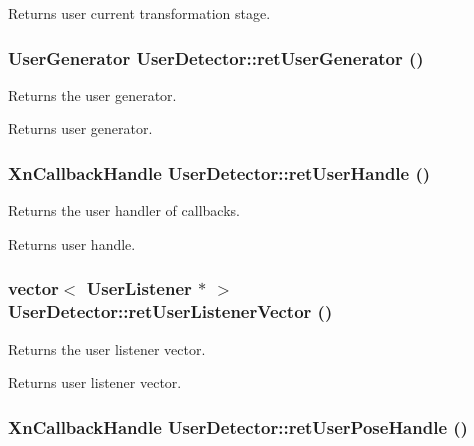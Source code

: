 \begin{DoxyReturn}{Returns}
user current transformation stage. 
\end{DoxyReturn}
\hypertarget{classUserDetector_a48f939c3a179902b64a7cd3306ce1945}{
\subsubsection[{retUserGenerator}]{\setlength{\rightskip}{0pt plus 5cm}UserGenerator UserDetector::retUserGenerator ()}}
\label{classUserDetector_a48f939c3a179902b64a7cd3306ce1945}
Returns the user generator. \begin{DoxyReturn}{Returns}
user generator. 
\end{DoxyReturn}
\hypertarget{classUserDetector_aa031f0e31c840bb0cc0926dc57c9e634}{
\subsubsection[{retUserHandle}]{\setlength{\rightskip}{0pt plus 5cm}XnCallbackHandle UserDetector::retUserHandle ()}}
\label{classUserDetector_aa031f0e31c840bb0cc0926dc57c9e634}
Returns the user handler of callbacks. \begin{DoxyReturn}{Returns}
user handle. 
\end{DoxyReturn}
\hypertarget{classUserDetector_ab36f575abf375bed3f947f584576635f}{
\subsubsection[{retUserListenerVector}]{\setlength{\rightskip}{0pt plus 5cm}vector$<$ {\bf UserListener} $\ast$ $>$ UserDetector::retUserListenerVector ()}}
\label{classUserDetector_ab36f575abf375bed3f947f584576635f}
Returns the user listener vector. \begin{DoxyReturn}{Returns}
user listener vector. 
\end{DoxyReturn}
\hypertarget{classUserDetector_aaf575a95cfe6d448c9869cabd873cf8d}{
\subsubsection[{retUserPoseHandle}]{\setlength{\rightskip}{0pt plus 5cm}XnCallbackHandle UserDetector::retUserPoseHandle ()}}
